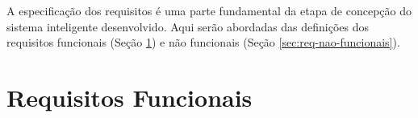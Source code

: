 














A especificação dos requisitos é uma parte fundamental da etapa de concepção do sistema inteligente desenvolvido. Aqui serão abordadas das definições dos requisitos funcionais (Seção \ref{sec:req-funcionais}) e não funcionais (Seção \ref{sec:req-nao-funcionais}).




\section{Requisitos Funcionais}
\label{sec:req-funcionais}


